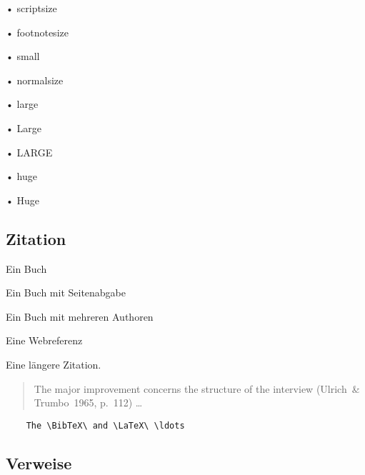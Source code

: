 \begin{scriptsize}
• scriptsize
\end{scriptsize}

\begin{footnotesize}
• footnotesize
\end{footnotesize}

\begin{small}
• small
\end{small}

\begin{normalsize}
• normalsize
\end{normalsize}

\begin{large}
• large
\end{large}

\begin{Large}
• Large
\end{Large}

\begin{LARGE}
• LARGE
\end{LARGE}

\begin{huge}
• huge
\end{huge}

\begin{Huge}
• Huge
\end{Huge}

\subsection{Zitation}\label{ssec:citation}

Ein Buch \cite{b:buch}\par
Ein Buch mit Seitenabgabe \cite[S. 3ff.]{b:latex}\par
Ein Buch mit mehreren Authoren \cite{b:komascript}\par
Eine Webreferenz \cite{w:website}\par
Eine längere Zitation.\par
\begin{quote}
	The major improvement concerns the structure of the interview
	(Ulrich~\& Trumbo~1965, p.~112) \ldots \par
	\blindtext
\end{quote}

\begin{verbatim}
	The \BibTeX\ and \LaTeX\ \ldots
\end{verbatim}

\subsection{Verweise}\label{ssec:verweise}

